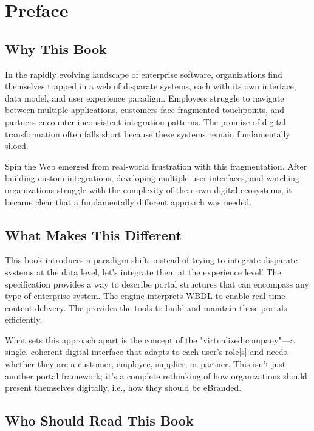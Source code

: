 
\chapter*{Preface}

\section*{Why This Book}

In the rapidly evolving landscape of enterprise software, organizations find themselves trapped in a web of disparate systems, each with its own interface, data model, and user experience paradigm. Employees struggle to navigate between multiple applications, customers face fragmented touchpoints, and partners encounter inconsistent integration patterns. The promise of digital transformation often falls short because these systems remain fundamentally siloed.

Spin the Web emerged from real-world frustration with this fragmentation. After building custom integrations, developing multiple user interfaces, and watching organizations struggle with the complexity of their own digital ecosystems, it became clear that a fundamentally different approach was needed.

\section*{What Makes This Different}

This book introduces a paradigm shift: instead of trying to integrate disparate systems at the data level, let's integrate them at the experience level! The \wbdl specification provides a way to describe portal structures that can encompass any type of enterprise system. The \webspinner engine interprets WBDL to enable real-time content delivery. The \studio provides the tools to build and maintain these portals efficiently.

What sets this approach apart is the concept of the "virtualized company"—a single, coherent digital interface that adapts to each user's role[s] and needs, whether they are a customer, employee, supplier, or partner. This isn't just another portal framework; it's a complete rethinking of how organizations should present themselves digitally, i.e., how they should be eBranded.

\section*{Who Should Read This Book}

